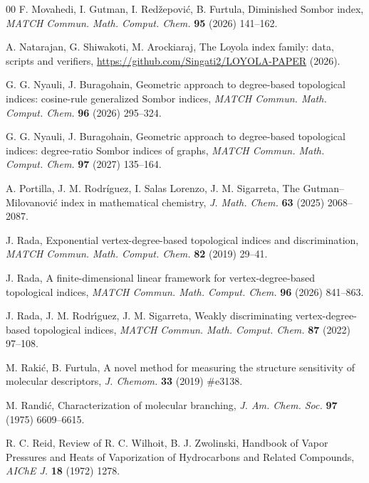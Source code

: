 \documentclass[a5paper, 10pt]{article}
\theoremstyle{plain}
\theoremstyle{remark}
\theoremstyle{definition}
\begin{document}
\begin{thebibliography}{00}
   F. Movahedi, I. Gutman, I.
  Red\v{z}epovi\'c, B. Furtula, Diminished Sombor index, \textit{MATCH Commun.
  Math. Comput. Chem.\/} \textbf{95} (2026) 141--162.

   A. Natarajan, G. Shiwakoti, M. Arockiaraj,
  The Loyola index family: data, scripts and verifiers,
  \url{https://github.com/Singati2/LOYOLA-PAPER} (2026).

   G. G. Nyauli, J. Buragohain, Geometric
  approach to degree-based topological indices: cosine-rule generalized
  Sombor indices, \textit{MATCH Commun. Math. Comput. Chem.\/} \textbf{96}
  (2026) 295--324.

   G. G. Nyauli, J. Buragohain,
  Geometric approach to degree-based topological indices: degree-ratio
  Sombor indices of graphs, \textit{MATCH Commun. Math. Comput. Chem.\/}
  \textbf{97} (2027) 135--164.

   A. Portilla, J. M. Rodr\'iguez,
  I. Salas Lorenzo, J. M. Sigarreta, The Gutman--Milovanovi\'c index
  in mathematical chemistry, \textit{J. Math. Chem.\/} \textbf{63}
  (2025) 2068--2087.

   J. Rada, Exponential vertex-degree-based
  topological indices and discrimination, \textit{MATCH Commun. Math.
  Comput. Chem.\/} \textbf{82} (2019) 29--41.

   J. Rada, A finite-dimensional linear
  framework for vertex-degree-based topological indices, \textit{MATCH
  Commun. Math. Comput. Chem.\/} \textbf{96} (2026) 841--863.

   J. Rada, J. M. Rodr\'{\i}guez,
  J. M. Sigarreta, Weakly discriminating vertex-degree-based topological
  indices, \textit{MATCH Commun. Math. Comput. Chem.\/} \textbf{87} (2022)
  97--108.

   M. Raki\'c, B. Furtula, A novel method for
  measuring the structure sensitivity of molecular descriptors, \textit{J. Chemom.\/} \textbf{33} (2019) \#e3138.

   M. Randi\'c, Characterization of molecular
  branching, \textit{J. Am. Chem. Soc.\/} \textbf{97} (1975) 6609--6615.

   R. C. Reid, Review of R. C. Wilhoit, B. J. Zwolinski, Handbook
  of Vapor Pressures and Heats of Vaporization of Hydrocarbons and Related
  Compounds, \textit{AIChE J.\/} \textbf{18} (1972) 1278.


\end{thebibliography}
\end{document}
